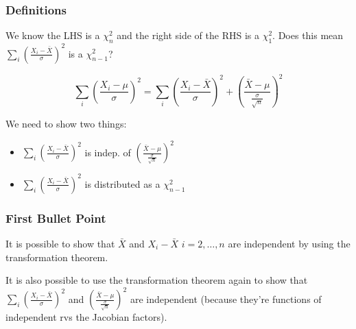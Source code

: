 \documentclass{beamer}
\begin{document}
\begin{frame}
\frametitle{Definitions}

We know the LHS is a $\chi^2_n$ and the right side of the RHS is a $\chi^2_1$. Does this mean $\sum_i \left(\frac{X_i - \bar{X}}{\sigma} \right)^2$ is a $\chi^2_{n-1}$?

\[
\sum_i \left( \frac{X_i - \mu}{\sigma} \right) ^2 
= \sum_i \left(\frac{X_i - \bar{X}}{\sigma} \right)^2 + \left( \frac{ \bar{X} - \mu }{ \frac{\sigma}{\sqrt{n}}  } \right)^2
\]

We need to show two things: 
\begin{itemize}
\item $\sum_i \left(\frac{X_i - \bar{X}}{\sigma} \right)^2$ is indep. of $\left( \frac{ \bar{X} - \mu }{ \frac{\sigma}{\sqrt{n}}  } \right)^2$
\item $\sum_i \left(\frac{X_i - \bar{X}}{\sigma} \right)^2$ is distributed as a $\chi^2_{n-1}$
\end{itemize}
\end{frame}


\begin{frame}
\frametitle{First Bullet Point}

% 

It is possible to show that $\bar{X}$ and $X_i - \bar{X}$ $i=2,\ldots,n$ are independent by using the transformation theorem. 
\newline

It is also possible to use the transformation theorem again to show that $\sum_i \left(\frac{X_i - \bar{X}}{\sigma} \right)^2$ and $\left( \frac{ \bar{X} - \mu }{ \frac{\sigma}{\sqrt{n}}  } \right)^2$ are independent (because they're functions of independent rvs the Jacobian factors). 

\end{frame}
\end{document}
